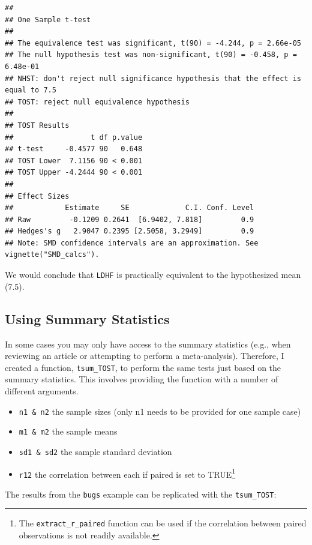 \documentclass[]{interact}
\theoremstyle{plain}%
\theoremstyle{definition}
\theoremstyle{remark}
\providecommand{\tightlist}{%
  \setlength{\itemsep}{0pt}\setlength{\parskip}{0pt}}
\def\tightlist{}
\begin{document}
\begin{verbatim}
## 
## One Sample t-test
## 
## The equivalence test was significant, t(90) = -4.244, p = 2.66e-05
## The null hypothesis test was non-significant, t(90) = -0.458, p = 6.48e-01
## NHST: don't reject null significance hypothesis that the effect is equal to 7.5 
## TOST: reject null equivalence hypothesis
## 
## TOST Results 
##                  t df p.value
## t-test     -0.4577 90   0.648
## TOST Lower  7.1156 90 < 0.001
## TOST Upper -4.2444 90 < 0.001
## 
## Effect Sizes 
##            Estimate     SE             C.I. Conf. Level
## Raw         -0.1209 0.2641  [6.9402, 7.818]         0.9
## Hedges's g   2.9047 0.2395 [2.5058, 3.2949]         0.9
## Note: SMD confidence intervals are an approximation. See vignette("SMD_calcs").
\end{verbatim}

We would conclude that \texttt{LDHF} is practically equivalent to the
hypothesized mean (7.5).

\newpage

\hypertarget{using-summary-statistics}{%
\subsection{Using Summary Statistics}\label{using-summary-statistics}}

In some cases you may only have access to the summary statistics (e.g.,
when reviewing an article or attempting to perform a meta-analysis).
Therefore, I created a function, \texttt{tsum\_TOST}, to perform the
same tests just based on the summary statistics. This involves providing
the function with a number of different arguments.

\begin{itemize}
\tightlist
\item
  \texttt{n1\ \&\ n2} the sample sizes (only n1 needs to be provided for
  one sample case)
\item
  \texttt{m1\ \&\ m2} the sample means
\item
  \texttt{sd1\ \&\ sd2} the sample standard deviation
\item
  \texttt{r12} the correlation between each if paired is set to
  TRUE\footnote{The \texttt{extract\_r\_paired} function can be used if
    the correlation between paired observations is not readily
    available.}
\end{itemize}

The results from the \texttt{bugs} example can be replicated with the
\texttt{tsum\_TOST}:
\end{document}
